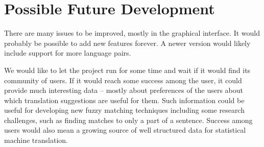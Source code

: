 \section{Possible Future Development}

There are many issues to be improved, mostly in the graphical interface. It would probably be possible to add new features forever. A newer version would likely include support for more language pairs.

We would like to let the project run for some time and wait if it would find its community of users. If it would reach some success among the user, it could provide much interesting data -- mostly about preferences of the users about which translation suggestions are useful for them. Such information could be useful for developing new fuzzy matching techniques including some research challenges, such as finding matches to only a part of a sentence. Success among users would also mean a growing source of well structured data for statistical machine translation.

